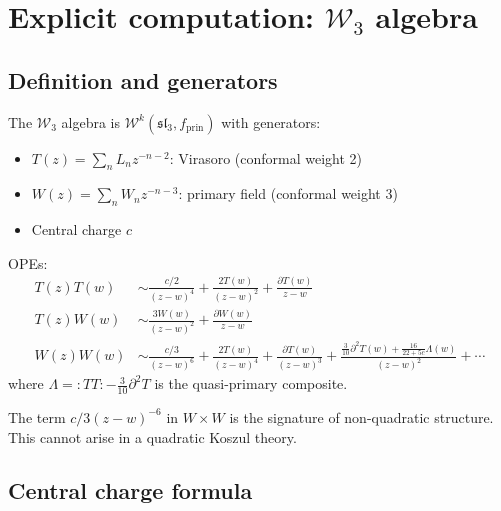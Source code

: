 \section{\texorpdfstring{Explicit computation: $\mathcal{W}_3$ algebra}{Explicit computation: W 3 algebra}}

\subsection{Definition and generators}

\begin{definition}\label{def:w3-algebra}
\label{def:w3-modes}
The $\mathcal{W}_3$ algebra is $\mathcal{W}^k(\mathfrak{sl}_3, f_{\text{prin}})$ with generators:
\begin{itemize}
\item $T(z) = \sum_n L_n z^{-n-2}$: Virasoro (conformal weight 2)
\item $W(z) = \sum_n W_n z^{-n-3}$: primary field (conformal weight 3)
\item Central charge $c$
\end{itemize}

OPEs:
\begin{align}
T(z)T(w) &\sim \frac{c/2}{(z-w)^4} + \frac{2T(w)}{(z-w)^2} + \frac{\partial T(w)}{z-w} \\
T(z)W(w) &\sim \frac{3W(w)}{(z-w)^2} + \frac{\partial W(w)}{z-w} \\
W(z)W(w) &\sim \frac{c/3}{(z-w)^6} + \frac{2T(w)}{(z-w)^4} + \frac{\partial T(w)}{(z-w)^3} + \frac{\frac{3}{10}\partial^2 T(w) + \frac{16}{22+5c}\Lambda(w)}{(z-w)^2} + \cdots
\end{align}
where $\Lambda = {:}TT{:} - \frac{3}{10}\partial^2 T$ is the quasi-primary composite.
\end{definition}

\begin{remark}
The term $c/3(z-w)^{-6}$ in $W \times W$ is the signature of non-quadratic structure. This cannot arise in a quadratic Koszul theory.
\end{remark}

\subsection{Central charge formula}

